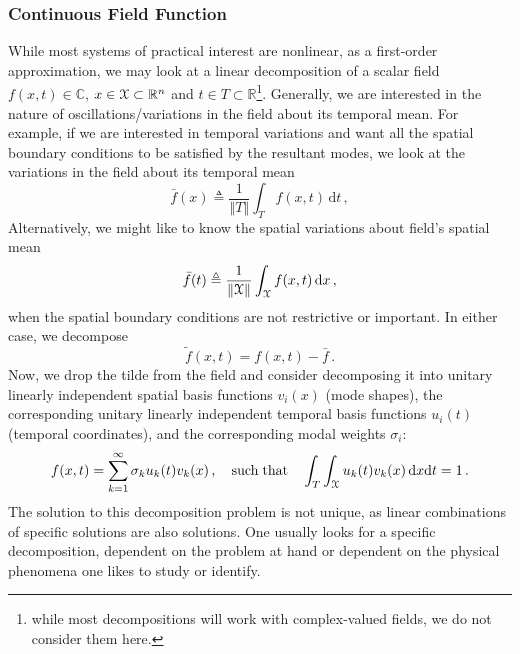 \documentclass[10pt]{article}
\newcommand{\norm}[1]{\left\Vert#1\right\Vert}
\begin{document}
\subsubsection{Continuous Field Function}
While most systems of practical interest are nonlinear, as a first-order approximation, we may look at a linear decomposition of a scalar field $f(x,t)\in \mathbb{C}$, ${x} \in  {\cal X} \subset \mathbb{R}^n$ and $t \in T\subset\mathbb{R}$\footnote{while most decompositions will work with complex-valued fields, we do not consider them here.}.
Generally, we are interested in the nature of oscillations/variations in the field about its temporal mean.
For example, if we are interested in temporal variations and want all the spatial boundary conditions to be satisfied by the resultant modes, we look at the variations in the field about its temporal mean 
\begin{equation}
    \bar f (x) \triangleq \frac{1}{\norm{T}} 
    \int_T f(x,t)\, \mathrm{d}t \,,
\end{equation}
Alternatively, we might like to know the spatial variations about field's spatial mean
\begin{equation}
    \bar f(t) \triangleq \frac{1}{\norm{{\cal X}}}\int_{\cal X} f(x,t)\, \mathrm{d} x\,,
\end{equation}
when the spatial boundary conditions are not restrictive or important. 
In either case, we decompose
\begin{equation}
    \tilde f(x,t) = f(x,t) - \bar f\,.
\end{equation}
Now, we drop the tilde from the field and consider decomposing it into unitary linearly independent spatial basis functions $v_i({x})$ (mode shapes), the corresponding unitary linearly independent temporal basis functions $u_i(t)$ (temporal coordinates), and the corresponding modal weights $\sigma_{i}$:
\begin{equation}\label{contfield}
f({x},t) = \sum_{k=1}^{\infty} \sigma_k u_k(t)
v_k({x})\,, \quad \mathrm{such\; that} \quad %
\int_T\int_{\cal X} u_k(t)v_k(x)\, \mathrm{d} x\mathrm{d} t = 1\,.
\end{equation}
The solution to this decomposition problem is not unique, as linear combinations of specific solutions are also solutions. 
One usually looks for a specific decomposition, dependent on the problem at hand or dependent on the physical phenomena one likes to study or identify.
\end{document}
